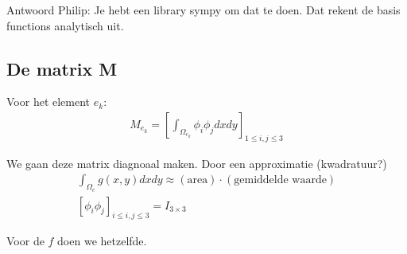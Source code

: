 \documentclass[11pt]{article}
\begin{document}
Antwoord Philip: Je hebt een library sympy om dat te doen. Dat rekent de basis functions analytisch uit.

\subsection{De matrix M}

Voor het element $e_k$:
\begin{align*}
    M_{e_k} = \left[\int_{\Omega_{e_k}}\phi_i\phi_jdxdy\right]_{1 \leq i, j \leq 3}
\end{align*}

We gaan deze matrix diagnoaal maken. Door een approximatie (kwadratuur?)
\begin{align*}
    \int_{\Omega_e}g(x,y)dxdy \approx (\text{area}) \cdot (\text{gemiddelde waarde}) \\
    \left[\phi_i\phi_j\right]_{i \leq i,j \leq 3} = I_{3 \times 3}
\end{align*}

Voor de $f$ doen we hetzelfde.
\end{document}
